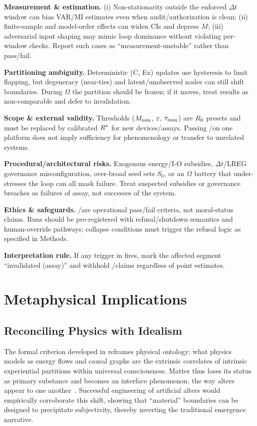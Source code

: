 \documentclass[11pt]{article}
\begin{document}
\textbf{Measurement \& estimation.} (i) Non-stationarity outside the enforced $\Delta t$ window can bias VAR/MI estimates even when audit/authorization is clean; (ii) finite-sample and model-order effects can widen CIs and depress $M$; (iii) adversarial input shaping may mimic loop dominance without violating per-window checks. Report such cases as ``measurement-unstable'' rather than pass/fail.

\textbf{Partitioning ambiguity.} Deterministic (C, Ex) updates use hysteresis to limit flapping, but degeneracy (near-ties) and latent/unobserved nodes can still shift boundaries. During $\Omega$ the partition should be frozen; if it moves, treat results as non-comparable and defer to  invalidation.

\textbf{Scope \& external validity.} Thresholds ($M_{\min}$, $\varepsilon$, $\tau_{\max}$) are $R_0$ presets and must be replaced by calibrated $R^*$ for new devices/assays. Passing \NC/\SC on one platform does not imply sufficiency for phenomenology or transfer to unrelated systems.

\textbf{Procedural/architectural risks.} Exogenous energy/I-O subsidies, $\Delta t$/LREG governance misconfiguration, over-broad seed sets $S_0$, or an $\Omega$ battery that under-stresses the loop can all mask failure. Treat suspected subsidies or governance breaches as failures of assay, not successes of the system.

\textbf{Ethics \& safeguards.} \NC/\SC are operational pass/fail criteria, not moral-status claims. Runs should be pre-registered with refusal/shutdown semantics and human-override pathways; collapse conditions must trigger the refusal logic as specified in Methods.

\textbf{Interpretation rule.} If any trigger in  fires, mark the affected segment ``invalidated (assay)'' and withhold \NC/\SC claims regardless of point estimates.

\section{Metaphysical Implications}
\label{sec:metaphysics}

\subsection{Reconciling Physics with Idealism}

The formal criterion developed in  reframes physical ontology: what physics models as energy flows and causal graphs are the extrinsic correlates of intrinsic experiential partitions within universal consciousness. Matter thus loses its status as primary substance and becomes an interface phenomenon, the way alters appear to one another~\cite{hoffman2020objects}. Successful engineering of artificial alters would empirically corroborate this shift, showing that ``material'' boundaries can be designed to precipitate subjectivity, thereby inverting the traditional emergence narrative.
\end{document}
